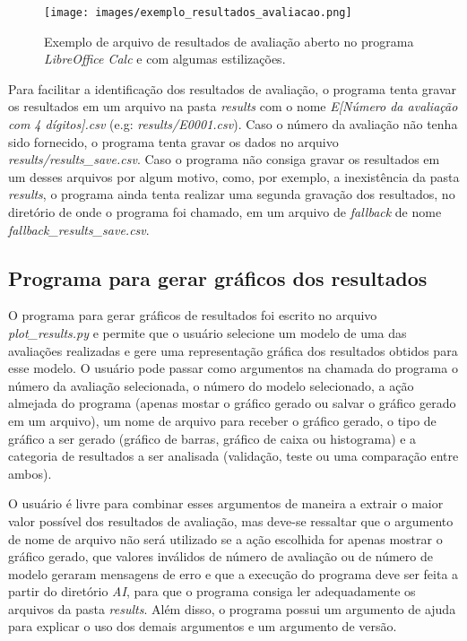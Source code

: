 \begin{figure}[h]
	\centering
	\texttt{[image: images/exemplo\_resultados\_avaliacao.png]}
	\caption{Exemplo de arquivo de resultados de avaliação aberto no programa \textit{LibreOffice Calc} e com algumas estilizações.}
	\label{fig:example_evaluation_results}
\end{figure}

Para facilitar a identificação dos resultados de avaliação, o programa tenta gravar os resultados em um arquivo na pasta \textit{results} com o nome \textit{E[Número da avaliação com 4 dígitos].csv} (e.g: \textit{results/E0001.csv}). Caso o número da avaliação não tenha sido fornecido, o programa tenta gravar os dados no arquivo \textit{results/results\_save.csv}. Caso o programa não consiga gravar os resultados em um desses arquivos por algum motivo, como, por exemplo, a inexistência da pasta \textit{results}, o programa ainda tenta realizar uma segunda gravação dos resultados, no diretório de onde o programa foi chamado, em um arquivo de \textit{fallback} de nome \textit{fallback\_results\_save.csv}.

\subsection{Programa para gerar gráficos dos resultados}

O programa para gerar gráficos de resultados foi escrito no arquivo \textit{plot\_results.py} e permite que o usuário selecione um modelo de uma das avaliações realizadas e gere uma representação gráfica dos resultados obtidos para esse modelo. O usuário pode passar como argumentos na chamada do programa o número da avaliação selecionada, o número do modelo selecionado, a ação almejada do programa (apenas mostar o gráfico gerado ou salvar o gráfico gerado em um arquivo), um nome de arquivo para receber o gráfico gerado, o tipo de gráfico a ser gerado (gráfico de barras, gráfico de caixa ou histograma) e a categoria de resultados a ser analisada (validação, teste ou uma comparação entre ambos).

O usuário é livre para combinar esses argumentos de maneira a extrair o maior valor possível dos resultados de avaliação, mas deve-se ressaltar que o argumento de nome de arquivo não será utilizado se a ação escolhida for apenas mostrar o gráfico gerado, que valores inválidos de número de avaliação ou de número de modelo geraram mensagens de erro e que a execução do programa deve ser feita a partir do diretório \textit{AI}, para que o programa consiga ler adequadamente os arquivos da pasta \textit{results}. Além disso, o programa possui um argumento de ajuda para explicar o uso dos demais argumentos e um argumento de versão.

